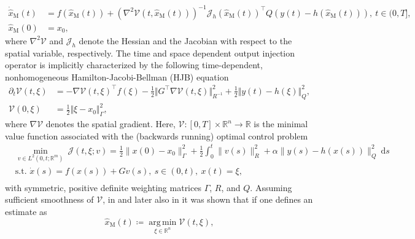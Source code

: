 \documentclass[11pt,reqno]{amsart}
\numberwithin{equation}{section}
\theoremstyle{plain}
\DeclareMathOperator*{\argmin}{arg\,min} %
\begin{document}
\begin{equation}\label{eq: observerEq}
	\begin{aligned}
		\dot{\widehat{x}}_{\mathrm{M}}(t) &= f(\widehat{x}_{\mathrm{M}}(t)) 
		+  (\nabla^2 \mathcal{V}(t,\widehat{x}_{\mathrm{M}}(t)))^{-1} \mathcal{J}_h(\widehat{x}_{\mathrm{M}}(t))^\top Q (y(t) - h(\widehat{x}_{\mathrm{M}}(t) ) ),~ t \in (0,T],\\
		\widehat{x}_{\mathrm{M}}(0) &= x_0,
	\end{aligned}
\end{equation}
where $\nabla^2 \mathcal{V}$ and $\mathcal{J}_h$ denote the Hessian and the Jacobian with respect to the spatial variable, respectively.
The time and space dependent output injection operator is implicitly characterized by the following time-dependent, nonhomogeneous Hamilton-Jacobi-Bellman (HJB) equation
%
\begin{equation}\label{eq: HJB}
	\begin{aligned}
		\partial_t \mathcal{V}(t,\xi) &=
		-\nabla \mathcal{V}(t,\xi)^\top f(\xi) 
		- \frac{1}{2} \Vert G^\top \nabla \mathcal{V}(t,\xi) \Vert_{R^{-1}}^2
		+ \frac{1}{2} \Vert y(t) - h(\xi) \Vert_Q^2,\\
		\mathcal{V}(0,\xi) &= \frac{1}{2} \Vert \xi - x_0 \Vert_\Gamma^2,
	\end{aligned}
\end{equation}
%
where $\nabla \mathcal{V}$ denotes the spatial gradient.
Here, $\mathcal{V}\colon [0,T]\times \mathbb R^n \to \mathbb R$ is the minimal value function associated with the (backwards running) optimal control problem 
%
\begin{equation}\label{eq:P_t} 
\begin{aligned}
&\underset{v\in L^2(0,t;\mathbb R^m)}{\min} ~\mathcal{J}(t,\xi; v) = \frac{1}{2} \|x(0) - x_0 \|_\Gamma^2 + \frac{1}{2} \int_{0}^{t} \|v(s)\|_{R}^2 + \alpha \|y(s)-h(x(s))\|_{Q}^2 ~\mathrm{d}s \\[2.5ex]
&\text{s.t. } \dot{x}(s) = f(x(s)) + Gv(s),~s \in (0,t), ~x(t) = \xi, \\
\end{aligned}
\end{equation}
%
with symmetric, positive definite weighting matrices $\Gamma$, $R$, and $Q$.
Assuming sufficient smoothness of $\mathcal{V}$, in \cite{Mor68} and later also in \cite{Fle97} it was shown that if one defines an estimate as
\begin{equation}\label{eq: observerDef}
	\widehat{x}_{\mathrm{M}}(t) \coloneqq \argmin\limits_{\xi \in \mathbb{R}^n} \mathcal{V}(t,\xi),
\end{equation}
\end{document}
